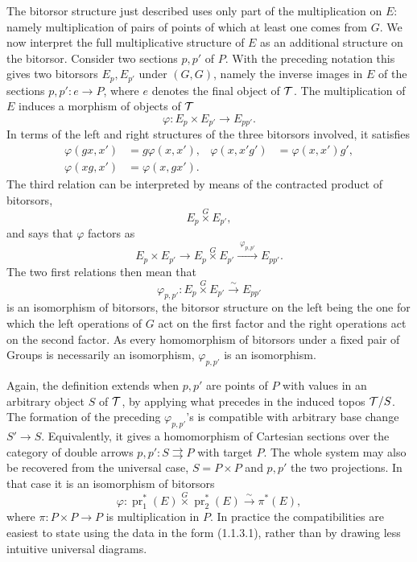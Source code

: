 \documentclass[11pt]{article}
\providecommand{\pr}{\operatorname{pr}}
\begin{document}
The bitorsor structure just described uses only part of the multiplication on \(E\): namely multiplication of pairs of points of which at least one comes from \(G\).  We now interpret the full multiplicative structure of \(E\) as an additional structure on the bitorsor.  Consider two sections \(p,p'\) of \(P\).  With the preceding notation this gives two bitorsors \(E_p,E_{p'}\) under \((G,G)\), namely the inverse images in \(E\) of the sections \(p,p':e\to P\), where \(e\) denotes the final object of \(\mathcal T\).  The multiplication of \(E\) induces a morphism of objects of \(\mathcal T\)
\[
  \varphi:E_p\times E_{p'}\longrightarrow E_{pp'}.
\]
In terms of the left and right structures of the three bitorsors involved, it satisfies
\begin{equation}\tag{1.1.3.0}
\begin{aligned}
 \varphi(gx,x')&=g\varphi(x,x'),&
 \varphi(x,x'g')&=\varphi(x,x')g',\\
 \varphi(xg,x')&=\varphi(x,gx').
\end{aligned}
\end{equation}
The third relation can be interpreted by means of the contracted product of bitorsors,
\[
  E_p\overset{G}{\times}E_{p'},
\]
and says that \(\varphi\) factors as
\[
  E_p\times E_{p'}\longrightarrow
  E_p\overset{G}{\times}E_{p'}
  \xrightarrow{\;\varphi_{p,p'}\;}E_{pp'}.
\]
The two first relations then mean that
\begin{equation}\tag{1.1.3.1}
  \varphi_{p,p'}:E_p\overset{G}{\times}E_{p'}\xrightarrow{\sim}E_{pp'}
\end{equation}
is an isomorphism of bitorsors, the bitorsor structure on the left being the one for which the left operations of \(G\) act on the first factor and the right operations act on the second factor.  As every homomorphism of bitorsors under a fixed pair of Groups is necessarily an isomorphism, \(\varphi_{p,p'}\) is an isomorphism.

Again, the definition extends when \(p,p'\) are points of \(P\) with values in an arbitrary object \(S\) of \(\mathcal T\), by applying what precedes in the induced topos \(\mathcal T/S\).  The formation of the preceding \(\varphi_{p,p'}\)'s is compatible with arbitrary base change \(S'\to S\).  Equivalently, it gives a homomorphism of Cartesian sections over the category of double arrows \(p,p':S\rightrightarrows P\) with target \(P\).  The whole system may also be recovered from the universal case, \(S=P\times P\) and \(p,p'\) the two projections.  In that case it is an isomorphism of bitorsors
\begin{equation}\tag{1.1.3.2}
  \varphi:\pr_1^*(E)\overset{G}{\times}\pr_2^*(E)
     \xrightarrow{\sim}\pi^*(E),
\end{equation}
where \(\pi:P\times P\to P\) is multiplication in \(P\).  In practice the compatibilities are easiest to state using the data in the form (1.1.3.1), rather than by drawing less intuitive universal diagrams.
\end{document}
